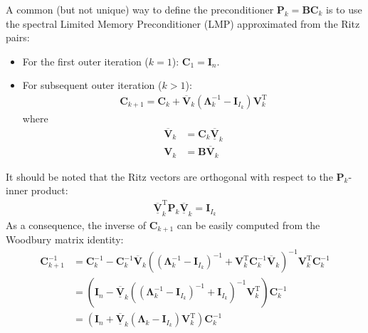 \documentclass[12pt]{scrartcl}
\begin{document}
A common (but not unique) way to define the preconditioner $\mathbf{P}_k = \mathbf{B}\mathbf{C}_k$ is to use the spectral Limited Memory Preconditioner (LMP) approximated from the Ritz pairs:
\begin{itemize}
\item For the first outer iteration ($k=1$): $\mathbf{C}_1 = \mathbf{I}_n$.
\item For subsequent outer iteration ($k>1$):
\begin{align}
\mathbf{C}_{k+1} = \mathbf{C}_k + \overline{\mathbf{V}}_k \left(\mathbf{\Lambda}_k^{-1} - \mathbf{I}_{I_k}\right) \mathbf{V}_k^\mathrm{T}
\end{align}
where
\begin{align}
\overline{\mathbf{V}}_k & = \mathbf{C}_k \underline{\overline{\mathbf{V}}}_k \\
\mathbf{V}_k & = \mathbf{B} \overline{\mathbf{V}}_k
\end{align}
\end{itemize}
It should be noted that the Ritz vectors are orthogonal with respect to the $\mathbf{P}_k$-inner product:
\begin{align}
\underline{\overline{\mathbf{V}}}_k^\mathrm{T} \mathbf{P}_k \underline{\overline{\mathbf{V}}}_k = \mathbf{I}_{I_k}
\end{align}
As a consequence, the inverse of $\mathbf{C}_{k+1}$ can be easily computed from the Woodbury matrix identity:
\begin{align}
\mathbf{C}_{k+1}^{-1} & = \mathbf{C}_k^{-1} - \mathbf{C}_k^{-1} \overline{\mathbf{V}}_k \left(\left(\mathbf{\Lambda}_k^{-1} - \mathbf{I}_{I_k}\right)^{-1}+\mathbf{V}_k^\mathrm{T} \mathbf{C}_k^{-1} \overline{\mathbf{V}}_k\right)^{-1} \mathbf{V}_k^\mathrm{T} \mathbf{C}_k^{-1} \nonumber \\
& = \left(\mathbf{I}_n-\underline{\overline{\mathbf{V}}}_k \left(\left(\mathbf{\Lambda}_k^{-1} - \mathbf{I}_{I_k}\right)^{-1}+\mathbf{I}_{I_k}\right)^{-1} \mathbf{V}_k^\mathrm{T}\right)\mathbf{C}_k^{-1} \nonumber \\
& = \left(\mathbf{I}_n+\underline{\overline{\mathbf{V}}}_k \left(\mathbf{\Lambda}_k-\mathbf{I}_{I_k}\right) \mathbf{V}_k^\mathrm{T}\right)\mathbf{C}_k^{-1}
\end{align}
\end{document}
